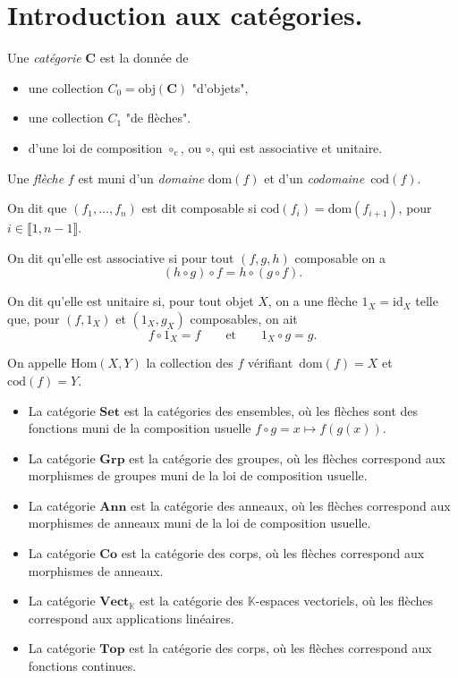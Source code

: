 \chapter{Introduction aux catégories.}

\begin{defn}
  Une \textit{catégorie} $\mathbf{C}$ est la donnée de
  \begin{itemize}
    \item une collection $C_0 = \mathrm{obj}(\mathbf{C})$ "d'objets",
    \item une collection $C_1$ "de flèches".
    \item d'une loi de composition $\circ_\mathrm{c}$, ou $\circ$, qui est associative et unitaire.
  \end{itemize}

  Une \textit{flèche} $f$ est muni d'un \textit{domaine} $\mathrm{dom}(f)$ et d'un  \textit{codomaine}~$\mathrm{cod}(f)$.

  On dit que $(f_1, \ldots, f_n)$ est dit composable si $\mathrm{cod}(f_i) = \mathrm{dom}(f_{i+1})$, pour $i \in \llbracket 1, n-1\rrbracket$.

  On dit qu'elle est associative si pour tout $(f,g,h)$ composable on a  \[
    (h \circ g) \circ f = h \circ (g\circ f)
  .\]

  On dit qu'elle est unitaire si, pour tout objet $X$, on a une flèche $1_X = \mathrm{id}_X$ telle que, pour $(f, 1_X)$ et $(1_X, g_X)$ composables, on ait \[
    f \circ 1_X = f  \quad\quad \text{et} \quad\quad 1_X \circ g = g
  .\]

  On appelle $\mathrm{Hom}(X,Y)$ la collection des $f$ vérifiant~$\mathrm{dom}(f) = X$ et $\mathrm{cod}(f) = Y$.
\end{defn}

\begin{exm}
  \begin{itemize}
    \item La catégorie $\mathbf{Set}$ est la catégories des ensembles, où les flèches sont des fonctions muni de la composition usuelle $f \circ g = x \mapsto f(g(x))$.
    \item La catégorie $\mathbf{Grp}$ est la catégorie des groupes, où les flèches correspond aux morphismes de groupes muni de la loi de composition usuelle.
    \item La catégorie $\mathbf{Ann}$ est la catégorie des anneaux, où les flèches correspond aux morphismes de anneaux muni de la loi de composition usuelle.
    \item La catégorie $\mathbf{Co}$ est la catégorie des corps, où les flèches correspond aux morphismes de anneaux.
    \item La catégorie $\mathbf{Vect}_\mathds{K}$ est la catégorie des $\mathds{K}$-espaces vectoriels,  où les flèches correspond aux applications linéaires.
    \item La catégorie $\mathbf{Top}$ est la catégorie des corps, où les flèches correspond aux fonctions continues.
  \end{itemize}
\end{exm}


